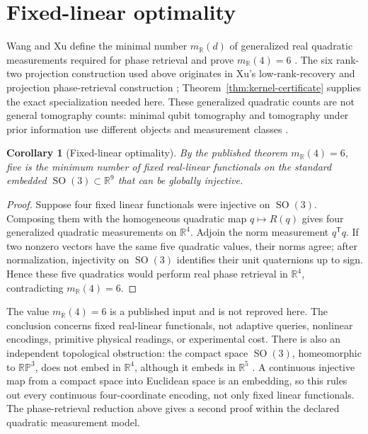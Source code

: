 \documentclass[12pt]{article}
\newtheorem{corollary}[theorem]{Corollary}
\theoremstyle{definition}
\theoremstyle{remark}
\newcommand{\RR}{\mathbb R}
\newcommand{\SO}{\operatorname{SO}}
\begin{document}
\section{Fixed-linear optimality}\label{sec:optimality}

Wang and Xu define the minimal number $m_{\RR}(d)$ of generalized real
quadratic measurements required for phase retrieval and prove
$m_{\RR}(4)=6$ \cite[Theorem 5.1 and the following remark]{WangXu2019}.
The six rank-two projection construction used above originates in Xu's
low-rank-recovery and projection phase-retrieval construction
\cite{Xu2018}; Theorem~\ref{thm:kernel-certificate} supplies the exact
specialization needed here.
These generalized quadratic counts are not general tomography counts:
minimal qubit tomography and tomography under prior information use different
objects and measurement classes
\cite{RehacekEtAl2004,HeinosaariMazzarellaWolf2013}.

\begin{corollary}[Fixed-linear optimality]
\label{cor:fixed-five-optimality-external}
By the published theorem $m_{\RR}(4)=6$, five is the minimum
number of fixed real-linear functionals on the standard embedded
$\SO(3)\subset\RR^9$ that can be globally injective.
\end{corollary}

\begin{proof}
Suppose four fixed linear functionals were injective on $\SO(3)$.  Composing
them with the homogeneous quadratic map $q\mapsto R(q)$ gives four
generalized quadratic measurements on $\RR^4$.  Adjoin the norm measurement
$q^\mathsf Tq$.  If two nonzero vectors have the same five quadratic values,
their norms agree; after normalization, injectivity on $\SO(3)$ identifies
their unit quaternions up to sign.  Hence these five quadratics would perform
real phase retrieval in $\RR^4$, contradicting $m_{\RR}(4)=6$.
\end{proof}

The value $m_{\RR}(4)=6$ is a published input and is not reproved here.  The
conclusion concerns fixed real-linear functionals, not adaptive queries,
nonlinear encodings, primitive physical readings, or experimental cost.
There is also an independent topological obstruction: the compact space
$\SO(3)$, homeomorphic to $\mathbb{RP}^3$, does not embed in $\RR^4$, although it embeds
in $\RR^5$ \cite[Sec.~4.1]{ZhouEtAl2019}.  A continuous injective map
from a compact space into Euclidean space is an embedding, so this rules
out every continuous four-coordinate encoding, not only fixed linear
functionals.  The phase-retrieval reduction above gives a second proof
within the declared quadratic measurement model.
\end{document}
